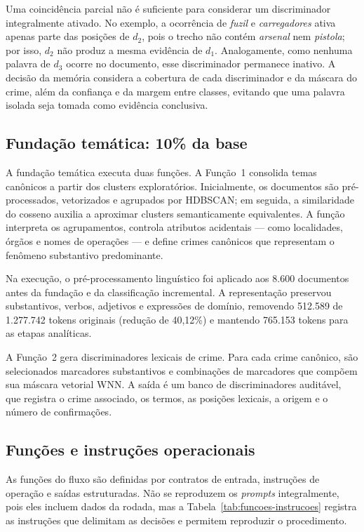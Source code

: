 Uma coincidência parcial não é suficiente para considerar um discriminador integralmente ativado. No exemplo, a ocorrência de \textit{fuzil} e \textit{carregadores} ativa apenas parte das posições de $d_2$, pois o trecho não contém \textit{arsenal} nem \textit{pistola}; por isso, $d_2$ não produz a mesma evidência de $d_1$. Analogamente, como nenhuma palavra de $d_3$ ocorre no documento, esse discriminador permanece inativo. A decisão da memória considera a cobertura de cada discriminador e da máscara do crime, além da confiança e da margem entre classes, evitando que uma palavra isolada seja tomada como evidência conclusiva.

\subsection{Fundação temática: 10\% da base}

A fundação temática executa duas funções. A Função~1 consolida temas canônicos a partir dos clusters exploratórios. Inicialmente, os documentos são pré-processados, vetorizados e agrupados por HDBSCAN; em seguida, a similaridade do cosseno auxilia a aproximar clusters semanticamente equivalentes. A função interpreta os agrupamentos, controla atributos acidentais --- como localidades, órgãos e nomes de operações --- e define crimes canônicos que representam o fenômeno substantivo predominante.

Na execução, o pré-processamento linguístico foi aplicado aos 8.600 documentos antes da fundação e da classificação incremental. A representação preservou substantivos, verbos, adjetivos e expressões de domínio, removendo 512.589 de 1.277.742 tokens originais (redução de 40,12\%) e mantendo 765.153 tokens para as etapas analíticas.

A Função~2 gera discriminadores lexicais de crime. Para cada crime canônico, são selecionados marcadores substantivos e combinações de marcadores que compõem sua máscara vetorial WNN. A saída é um banco de discriminadores auditável, que registra o crime associado, os termos, as posições lexicais, a origem e o número de confirmações.

\subsection{Funções e instruções operacionais}

As funções do fluxo são definidas por contratos de entrada, instruções de operação e saídas estruturadas. Não se reproduzem os \textit{prompts} integralmente, pois eles incluem dados da rodada, mas a Tabela~\ref{tab:funcoes-instrucoes} registra as instruções que delimitam as decisões e permitem reproduzir o procedimento.


